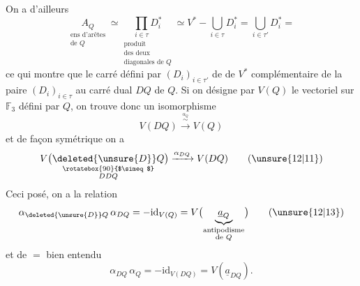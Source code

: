  On a d'ailleurs
\[
\underset{\substack{\text{ens d'arêtes}\\\text{de }Q}}{A_Q}
 \simeq\underset{\substack{\text{produit}\\\text{des deux}\\\text{diagonales de }Q}}{\prod_{i\in\tau}D_i^*}
 \simeq V^*-\bigcup_{i\in\tau}D_i^*
 =\bigcup_{i\in\tau'}D_i^*=
\]
ce qui montre que  le carré défini par   $(D_i)_{i\in\tau'}$ de  de $V^*$ complémentaire de la paire $(D_i)_{i\in\tau}$  au carré dual $DQ$ de $Q$. Si on désigne par $V(Q)$ le  vectoriel sur $\mathbb F_3$ défini par $Q$, on trouve donc un isomorphisme
\[
V(DQ)\xrightarrow{\overset{\alpha_Q}{\sim}}V(Q)
\tag*{(11)}
\]
et de façon symétrique on a
\[
V\bigl(\underset{\substack{\rotatebox{90}{$\simeq$}\\DDQ}}{\deleted{\unsure{D}}Q}\bigr)
 \xrightarrow{\alpha_{DQ}}V(DQ)
\tag*{(\unsure{12|11})}
\]
Ceci posé, on a la relation
\[
\alpha_{\deleted{\unsure{D}}Q}\,\alpha_{DQ}=-\mathrm{id}_{V(Q)}
=V\bigl(\underset{\substack{\text{antipodisme}\\\text{de }Q}}{\underbrace{\underline{a}_{Q}}}\bigr)
\tag*{(\unsure{12|13})}
\]
et de $=$ bien entendu
\[
\alpha_{DQ}\,\alpha_Q=-\mathrm{id}_{V(DQ)}=V(\underline{a}_{DQ}).
\]
